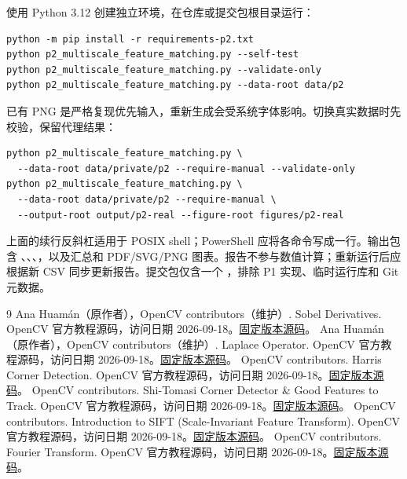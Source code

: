 \noindent\begin{minipage}{\linewidth}
使用 Python 3.12 创建独立环境，在仓库或提交包根目录运行：
\begin{verbatim}
python -m pip install -r requirements-p2.txt
python p2_multiscale_feature_matching.py --self-test
python p2_multiscale_feature_matching.py --validate-only
python p2_multiscale_feature_matching.py --data-root data/p2
\end{verbatim}
\end{minipage}
已有 PNG 是严格复现优先输入，重新生成会受系统字体影响。切换真实数据时先校验，保留代理结果：
\begin{verbatim}
python p2_multiscale_feature_matching.py \
  --data-root data/private/p2 --require-manual --validate-only
python p2_multiscale_feature_matching.py \
  --data-root data/private/p2 --require-manual \
  --output-root output/p2-real --figure-root figures/p2-real
\end{verbatim}
上面的续行反斜杠适用于 POSIX shell；PowerShell 应将各命令写成一行。输出包含 、、、，以及汇总和 PDF/SVG/PNG 图表。报告不参与数值计算；重新运行后应根据新 CSV 同步更新报告。提交包仅含一个 ，排除 P1 实现、临时运行库和 Git 元数据。

\begin{thebibliography}{9}
\small
{} Ana Huam\'{a}n（原作者），OpenCV contributors（维护）. Sobel Derivatives. OpenCV 官方教程源码，访问日期 2026-09-18。\href{https://github.com/opencv/opencv/blob/cf66d2c6add2e94396eabcaf5e85a4578dc3636b/doc/tutorials/imgproc/imgtrans/sobel_derivatives/sobel_derivatives.markdown}{固定版本源码}。
\bibitem{laplace} Ana Huam\'{a}n（原作者），OpenCV contributors（维护）. Laplace Operator. OpenCV 官方教程源码，访问日期 2026-09-18。\href{https://github.com/opencv/opencv/blob/cf66d2c6add2e94396eabcaf5e85a4578dc3636b/doc/tutorials/imgproc/imgtrans/laplace_operator/laplace_operator.markdown}{固定版本源码}。
 OpenCV contributors. Harris Corner Detection. OpenCV 官方教程源码，访问日期 2026-09-18。\href{https://github.com/opencv/opencv/blob/cf66d2c6add2e94396eabcaf5e85a4578dc3636b/doc/py_tutorials/py_feature2d/py_features_harris/py_features_harris.markdown}{固定版本源码}。
\bibitem{shi} OpenCV contributors. Shi-Tomasi Corner Detector \& Good Features to Track. OpenCV 官方教程源码，访问日期 2026-09-18。\href{https://github.com/opencv/opencv/blob/cf66d2c6add2e94396eabcaf5e85a4578dc3636b/doc/py_tutorials/py_feature2d/py_shi_tomasi/py_shi_tomasi.markdown}{固定版本源码}。
\bibitem{sift} OpenCV contributors. Introduction to SIFT (Scale-Invariant Feature Transform). OpenCV 官方教程源码，访问日期 2026-09-18。\href{https://github.com/opencv/opencv/blob/cf66d2c6add2e94396eabcaf5e85a4578dc3636b/doc/py_tutorials/py_feature2d/py_sift_intro/py_sift_intro.markdown}{固定版本源码}。
\bibitem{fourier} OpenCV contributors. Fourier Transform. OpenCV 官方教程源码，访问日期 2026-09-18。\href{https://github.com/opencv/opencv/blob/cf66d2c6add2e94396eabcaf5e85a4578dc3636b/doc/py_tutorials/py_imgproc/py_transforms/py_fourier_transform/py_fourier_transform.markdown}{固定版本源码}。
\end{thebibliography}

